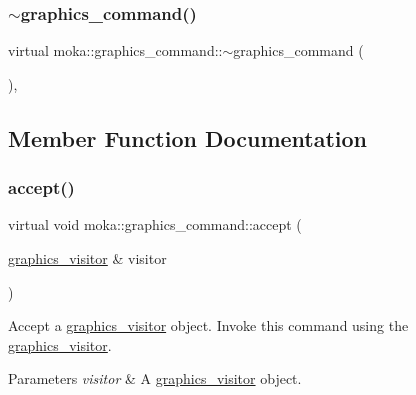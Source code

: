 \subsubsection{\texorpdfstring{$\sim$graphics\_command()}{~graphics\_command()}}
{\footnotesize\ttfamily virtual moka\+::graphics\+\_\+command\+::$\sim$graphics\+\_\+command (\begin{DoxyParamCaption}{ }\end{DoxyParamCaption})\hspace{0.3cm}{\ttfamily [virtual]}, {\ttfamily [default]}}



\subsection{Member Function Documentation}
\mbox{\label{classmoka_1_1graphics__command_a7affaeceb1019ab358c62185bce4e654}} 
\subsubsection{\texorpdfstring{accept()}{accept()}}
{\footnotesize\ttfamily virtual void moka\+::graphics\+\_\+command\+::accept (\begin{DoxyParamCaption}\item[{\mbox{\hyperlink{classmoka_1_1graphics__visitor}{graphics\+\_\+visitor}} \&}]{visitor }\end{DoxyParamCaption})\hspace{0.3cm}{\ttfamily [pure virtual]}}



Accept a \mbox{\hyperlink{classmoka_1_1graphics__visitor}{graphics\+\_\+visitor}} object. Invoke this command using the \mbox{\hyperlink{classmoka_1_1graphics__visitor}{graphics\+\_\+visitor}}. 


\begin{DoxyParams}{Parameters}
{\em visitor} & A \mbox{\hyperlink{classmoka_1_1graphics__visitor}{graphics\+\_\+visitor}} object. \\
\hline
\end{DoxyParams}


